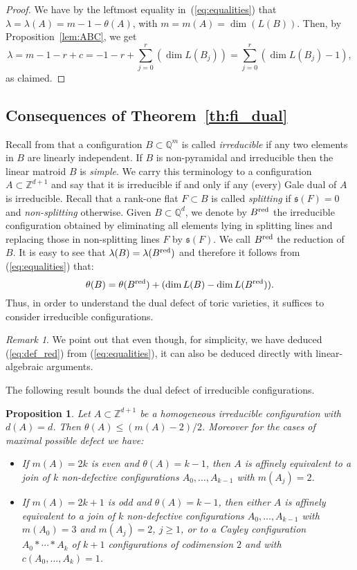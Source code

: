 \documentclass[11pt]{amsart}
\theoremstyle{plain}
\newtheorem{proposition}[theorem]{Proposition}
\theoremstyle{definition}
\newcounter{remarks}
\theoremstyle{remark}
\newtheorem{remark}[remarks]{Remark}
\newcommand{\baseRing}[1]{\ensuremath{\mathbb{#1}}}
\newcommand{\Z}{\baseRing{Z}}
\newcommand{\Q}{\baseRing{Q}}
\newcommand{\bp}{\begin{proof}}
\newcommand{\ep}{\end{proof}}
\newcommand{\beq}{\begin{equation}}
\newcommand{\eeq}{\end{equation}}
\numberwithin{equation}{section}
\begin{document}
\bp
We have by the leftmost equality in~(\ref{eq:equalities}) that $\lambda = \lambda(A) = m - 1 - \theta(A)$, with $m=m(A) = \dim(L(B))$.
Then, by Proposition~\ref{lem:ABC}, we get
$$ \lambda = m -1 -r +c =  -1 - r + \sum_{j=0}^r (\dim L(B_j)) = \sum_{j=0}^r (\dim L(B_j) - 1),$$
as claimed.
\ep


\subsection{\bf{Consequences of 
Theorem~\ref{th:fi_dual}}}\label{ssec:BFI}
 
Recall from \cite[Definition~5]{CC} that a configuration $B\subset \Q^m$ is called {\em irreducible} if any two elements in $B$ are linearly independent.  
If $B$ is non-pyramidal and irreducible then the linear matroid $B$ is {\em simple}. We carry this terminology to a configuration $A \subset \Z^{d+1}$ and 
say that it is irreducible if and only if any (every) Gale dual of $A$ is irreducible.  Recall that a rank-one flat $F \subset B$ is called {\em splitting} if 
${\mathfrak s}(F) = 0$ and {\em non-splitting} otherwise.  Given $B\subset \Q^d$, we denote by $B^{{\rm red}}$ the irreducible configuration 
obtained by eliminating all elements lying in splitting lines and replacing those in non-splitting lines $F$ by
${\mathfrak s}(F)$.  We call $B^{{\rm red}}$  the reduction of $B$.  It is easy to see that $\lambda(B) = \lambda(B^{{\rm red}})$ and therefore 
it follows from (\ref{eq:equalities}) that:
\beq\label{eq:def_red}
\theta(B) = \theta(B^{{\rm red}}) + (\dim L(B) - \dim L(B^{{\rm red}})).
\eeq
Thus, in order to understand the dual defect of toric varieties, it suffices to consider irreducible configurations.  

\begin{remark} We point out that even though, for simplicity, we have deduced (\ref{eq:def_red}) from (\ref{eq:equalities}), 
it can also be deduced directly with linear-algebraic arguments.  
\end{remark}

The following result bounds the dual defect of irreducible configurations.

\begin{proposition}\label{prop:max_def} 
Let $A \subset \Z^{d+1}$ be a homogeneous irreducible configuration with $d(A)=d$.  Then $\theta(A) \leq (m(A) - 2)/2$.
Moreover for the cases of maximal possible defect we have:
\begin{itemize} 
\item
If $m(A) = 2k$ is even and $\theta(A) =k-1$, then $A$ is affinely equivalent to a join of $k$ non-defective configurations $A_0,\dots,A_{k-1}$ with $m(A_j) = 2$.
\item If $m(A) = 2k+1$ is odd and $\theta(A) =k-1$, then either $A$ is affinely equivalent to a join of $k$ non-defective configurations $A_0,\dots,A_{k-1}$ 
with $m(A_0)=3$ and $m(A_j) = 2$, $j\geq 1$, or to a Cayley configuration 
$ A_0 \ast \cdots \ast A_k$
of $k+1$ configurations of codimension $2$ and with $c(A_0,\dots,A_k) = 1$.
\end{itemize}
\end{proposition}
\end{document}
